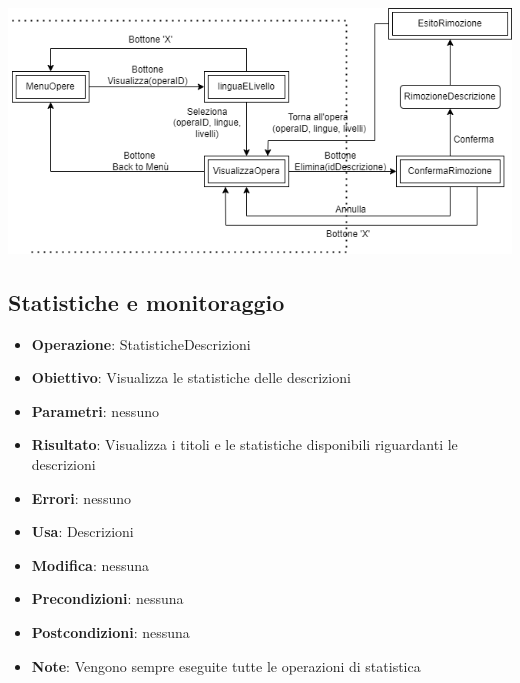\includegraphics[width=\textwidth]{img/RimozDescr.png}\\[1cm]

\subsection{Statistiche e monitoraggio}
\begin{itemize}
	\item \textbf{Operazione}: StatisticheDescrizioni
	\item \textbf{Obiettivo}: Visualizza le statistiche delle descrizioni
	\item \textbf{Parametri}: nessuno
	\item \textbf{Risultato}: Visualizza i titoli e le statistiche disponibili riguardanti le descrizioni
	\item \textbf{Errori}: nessuno
	\item \textbf{Usa}: Descrizioni
	\item \textbf{Modifica}: nessuna
	\item \textbf{Precondizioni}: nessuna
	\item \textbf{Postcondizioni}: nessuna
	\item \textbf{Note}: Vengono sempre eseguite tutte le operazioni di statistica
\end{itemize}

